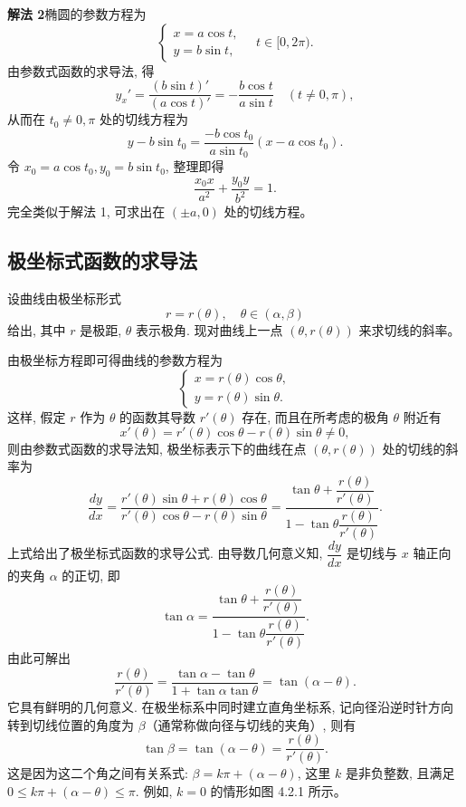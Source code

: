 \documentclass[UTF8,12pt,a4paper,fontset=fandol]{ctexart}
\begin{document}
\noindent\textbf{解法 2}\quad 椭圆的参数方程为
\[
  \begin{cases}
    x=a\cos t,\\
    y=b\sin t,
  \end{cases}
  \quad t\in[0,2\pi).
\]
由参数式函数的求导法, 得
\[
  y_x'=\frac{(b\sin t)'}{(a\cos t)'}
  =
  -\frac{b\cos t}{a\sin t}
  \quad(t\ne0,\pi),
\]
从而在 $t_0\ne0,\pi$ 处的切线方程为
\[
  y-b\sin t_0=
  \frac{-b\cos t_0}{a\sin t_0}(x-a\cos t_0).
\]
令 $x_0=a\cos t_0,y_0=b\sin t_0$, 整理即得
\[
  \frac{x_0x}{a^2}+\frac{y_0y}{b^2}=1.
\]
完全类似于解法 1, 可求出在 $(\pm a,0)$ 处的切线方程。

\subsection{极坐标式函数的求导法}

设曲线由极坐标形式
\[
  r=r(\theta),\quad \theta\in(\alpha,\beta)
\]
给出, 其中 $r$ 是极距, $\theta$ 表示极角. 现对曲线上一点 $(\theta,r(\theta))$ 来求切线的斜率。

由极坐标方程即可得曲线的参数方程为
\[
  \begin{cases}
    x=r(\theta)\cos\theta,\\
    y=r(\theta)\sin\theta.
  \end{cases}
\]
这样, 假定 $r$ 作为 $\theta$ 的函数其导数 $r'(\theta)$ 存在, 而且在所考虑的极角 $\theta$ 附近有
\[
  x'(\theta)=r'(\theta)\cos\theta-r(\theta)\sin\theta\ne0,
\]
则由参数式函数的求导法知, 极坐标表示下的曲线在点 $(\theta,r(\theta))$ 处的切线的斜率为
\[
  \frac{dy}{dx}
  =
  \frac{r'(\theta)\sin\theta+r(\theta)\cos\theta}
       {r'(\theta)\cos\theta-r(\theta)\sin\theta}
  =
  \frac{\tan\theta+\dfrac{r(\theta)}{r'(\theta)}}
       {1-\tan\theta\dfrac{r(\theta)}{r'(\theta)}}.
\]
上式给出了极坐标式函数的求导公式. 由导数几何意义知, $\dfrac{dy}{dx}$ 是切线与 $x$ 轴正向的夹角 $\alpha$ 的正切, 即
\[
  \tan\alpha=
  \frac{\tan\theta+\dfrac{r(\theta)}{r'(\theta)}}
       {1-\tan\theta\dfrac{r(\theta)}{r'(\theta)}}.
\]
由此可解出
\[
  \frac{r(\theta)}{r'(\theta)}
  =
  \frac{\tan\alpha-\tan\theta}{1+\tan\alpha\tan\theta}
  =
  \tan(\alpha-\theta).
\]
它具有鲜明的几何意义. 在极坐标系中同时建立直角坐标系, 记向径沿逆时针方向转到切线位置的角度为 $\beta$（通常称做向径与切线的夹角）, 则有
\[
  \tan\beta=\tan(\alpha-\theta)=\frac{r(\theta)}{r'(\theta)}.
\]
这是因为这二个角之间有关系式: $\beta=k\pi+(\alpha-\theta)$, 这里 $k$ 是非负整数, 且满足 $0\leqslant k\pi+(\alpha-\theta)\leqslant\pi$. 例如, $k=0$ 的情形如图 4.2.1 所示。
\end{document}
